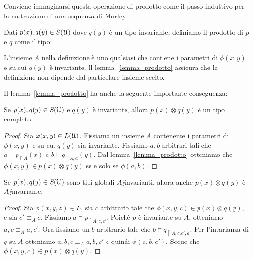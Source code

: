 Conviene immaginarsi questa operazione di prodotto come il passo induttivo per la costruzione di una sequenza di Morley.

\begin{definition}\label{def_prodotto_tipi}
Dati $p(x),q(y)\in S(\EuScript U)$ dove $q(y)$ \`e un tipo invariante, definiamo il prodotto di $p$ e $q$ come il tipo:



L'insieme $A$ nella definizione \`e uno qualsiasi che contiene i parametri di $\phi(x,y)$ e su cui $q(y)$ \`e invariante. Il lemma~\ref{lemma_prodotto} assicura che la definizione non dipende dal particolare insieme scelto.\QED
\end{definition}

Il lemma~\ref{lemma_prodotto} ha anche la seguente importante conseguenza:

\begin{corollary}\label{cor_otimes_completo}
Se $p(x),q(y)\in S(\EuScript U)$ e $q(y)$ \`e invariante, allora $p(x)\otimes q(y)$ \`e un tipo completo.
\end{corollary}

\begin{proof}
Sia $\varphi(x,y)\in L(\EuScript U)$. Fissiamo un insieme $A$ contenente i parametri di $\phi(x,y)$ e su cui $q(y)$ sia invariante. Fissiamo $a,b$ arbitrari tali che $a\models p_{\restriction A}(x)$ e $b\models q_{\restriction A,a}(y)$. Dal lemma~\ref{lemma_prodotto} otteniamo che $\phi(x,y)\in p(x)\otimes q(y)$ se e solo se $\phi(a,b)$.
\end{proof}


\begin{corollary}
Se $p(x),q(y)\in S(\EuScript U)$ sono tipi globali $A\jj$invarianti, allora anche $p(x)\otimes q(y)$ \`e $A\jj$invariante.
\end{corollary}

\begin{proof}
Sia $\phi(x,y,z)\in L$, sia $c$ arbitrario tale che  $\phi(x,y,c)\in p(x)\otimes q(y)$, e sia $c'\equiv_Ac$. Fissiamo $a\models p_{\restriction A,c,c'}$. Poich\'e $p$ \`e invariante su $A$, otteniamo $a,c\equiv_Aa,c'$. Ora fissiamo un $b$ arbitrario tale che $b\models q_{\restriction A,c,c',a}$. Per l'invarianza di $q$ su $A$ otteniamo  $a,b,c\equiv_Aa,b,c'$ e quindi $\phi(a,b,c')$. Seque che $\phi(x,y,c)\in p(x)\otimes q(y)$.
\end{proof}

